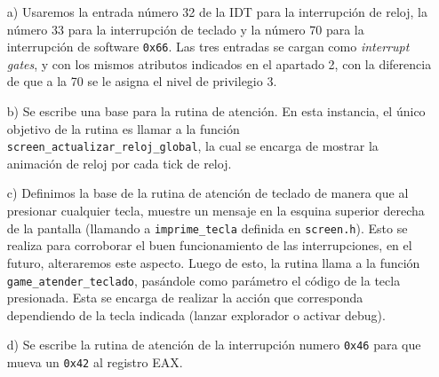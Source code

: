 \begin{enumerate}
\item[a)]Usaremos la entrada número 32 de la IDT para la interrupción de reloj, la número 33 para la interrupción de teclado y la número 70 para la interrupción de software {\tt 0x66}.  Las tres entradas se cargan como {\it interrupt gates}, y con los mismos atributos indicados en el apartado 2, con la diferencia de que a la 70 se le asigna el nivel de privilegio 3.

\item[b)]Se escribe una base para la rutina de atención. En esta instancia, el único objetivo de la rutina es llamar a la función {\tt screen_actualizar_reloj_global}, la cual se encarga de mostrar la animación de reloj por cada tick de reloj.

\item[c)]Definimos la base de la rutina de atención de teclado de manera que al presionar cualquier tecla, muestre un mensaje en la esquina superior derecha de la pantalla (llamando a {\tt imprime_tecla} definida en {\tt screen.h}). Esto se realiza para corroborar el buen funcionamiento de las interrupciones, en el futuro, alteraremos este aspecto. Luego de esto, la rutina llama a la función {\tt game_atender_teclado}, pasándole como parámetro el código de la tecla presionada. Esta se encarga de realizar la acción que corresponda dependiendo de la tecla indicada (lanzar explorador o activar debug).

\item[d)]Se escribe la rutina de atención de la interrupción numero {\tt 0x46} para que mueva un {\tt 0x42} al registro EAX.

\end{enumerate}
